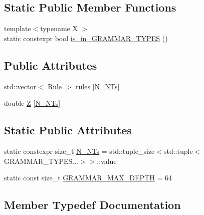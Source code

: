 \subsection*{Static Public Member Functions}
\begin{DoxyCompactItemize}
\item 
{\footnotesize template$<$typename X $>$ }\\static constexpr bool \hyperlink{class_grammar_a9ec7418e0263e2ade2340e248c04275d}{is\+\_\+in\+\_\+\+G\+R\+A\+M\+M\+A\+R\+\_\+\+T\+Y\+P\+ES} ()
\end{DoxyCompactItemize}
\subsection*{Public Attributes}
\begin{DoxyCompactItemize}
\item 
std\+::vector$<$ \hyperlink{class_rule}{Rule} $>$ \hyperlink{class_grammar_a8a89ced0753d72f52ccf2b04c0ccc82b}{rules} \mbox{[}\hyperlink{class_grammar_a45877d4d7a5ee98bf6753af593d6ca08}{N\+\_\+\+N\+Ts}\mbox{]}
\item 
double \hyperlink{class_grammar_a63420ee4232c46523a46bd881cb3e2f5}{Z} \mbox{[}\hyperlink{class_grammar_a45877d4d7a5ee98bf6753af593d6ca08}{N\+\_\+\+N\+Ts}\mbox{]}
\end{DoxyCompactItemize}
\subsection*{Static Public Attributes}
\begin{DoxyCompactItemize}
\item 
static constexpr size\+\_\+t \hyperlink{class_grammar_a45877d4d7a5ee98bf6753af593d6ca08}{N\+\_\+\+N\+Ts} = std\+::tuple\+\_\+size$<$std\+::tuple$<$G\+R\+A\+M\+M\+A\+R\+\_\+\+T\+Y\+P\+E\+S...$>$$>$\+::value
\item 
static const size\+\_\+t \hyperlink{class_grammar_a4a0d1d38426ce7f1b68c001e9ddec064}{G\+R\+A\+M\+M\+A\+R\+\_\+\+M\+A\+X\+\_\+\+D\+E\+P\+TH} = 64
\end{DoxyCompactItemize}


\subsection{Member Typedef Documentation}
\mbox{\label{class_grammar_a5ba44586d1c6f847cbbeeead91964e3c}} 

